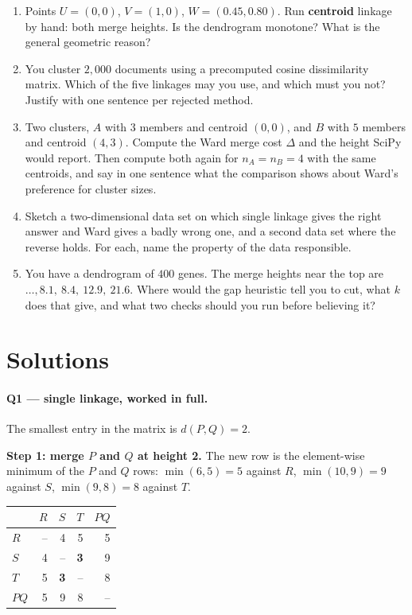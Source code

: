 \documentclass[11pt]{article}
\begin{document}
\begin{enumerate}[leftmargin=*, label=\textbf{Q\arabic*.}]
  \item Points $U = (0,0)$, $V = (1,0)$, $W = (0.45, 0.80)$. Run
    \textbf{centroid} linkage by hand: both merge heights. Is the dendrogram
    monotone? What is the general geometric reason?

  \item You cluster $2{,}000$ documents using a precomputed cosine
    dissimilarity matrix. Which of the five linkages may you use, and which
    must you not? Justify with one sentence per rejected method.

  \item Two clusters, $A$ with $3$ members and centroid $(0,0)$, and $B$ with
    $5$ members and centroid $(4,3)$. Compute the Ward merge cost $\Delta$ and
    the height SciPy would report. Then compute both again for $n_A = n_B = 4$
    with the same centroids, and say in one sentence what the comparison shows
    about Ward's preference for cluster sizes.

  \item Sketch a two-dimensional data set on which single linkage gives the
    right answer and Ward gives a badly wrong one, and a second data set where
    the reverse holds. For each, name the property of the data responsible.

  \item You have a dendrogram of $400$ genes. The merge heights near the top
    are $\ldots, 8.1,\ 8.4,\ 12.9,\ 21.6$. Where would the gap heuristic tell
    you to cut, what $k$ does that give, and what two checks should you run
    before believing it?
\end{enumerate}

\section{Solutions}
\label{sec:solutions}

\paragraph{Q1 --- single linkage, worked in full.}
The smallest entry in the matrix is $d(P,Q) = 2$.

\textbf{Step 1: merge $P$ and $Q$ at height 2.} The new row is the
element-wise minimum of the $P$ and $Q$ rows: $\min(6,5) = 5$ against $R$,
$\min(10,9) = 9$ against $S$, $\min(9,8) = 8$ against $T$.
\begin{center}\small
\begin{tabular}{lrrrr}
  \toprule
  & $R$ & $S$ & $T$ & $PQ$ \\
  \midrule
  $R$  & -- & 4 & 5 & 5 \\
  $S$  & 4  & --& \textbf{3} & 9 \\
  $T$  & 5  & \textbf{3} & --& 8 \\
  $PQ$ & 5  & 9 & 8 & -- \\
  \bottomrule
\end{tabular}
\end{center}
\end{document}
